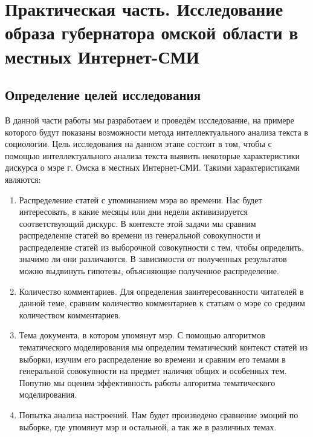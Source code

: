\chapter{Практическая часть. Исследование образа губернатора омской области в местных Интернет-СМИ} \label{chapt2}
\section{Определение целей исследования} \label{sect2_1}
В данной части работы мы разработаем и проведём исследование, на примере которого будут показаны возможности метода интеллектуального анализа текста в социологии. Цель исследования на данном этапе состоит в том, чтобы с помощью интеллектуального анализа текста выявить некоторые характеристики дискурса о мэре г. Омска в местных Интернет-СМИ. Такими характеристиками являются:
\begin{enumerate}
\item Распределение статей с упоминанием мэра во времени. Нас будет интересовать, в какие месяцы или дни недели активизируется соответствующий дискурс. В контексте этой задачи мы сравним распределение статей во времени из генеральной совокупности и распределение статей из выборочной совокупности с тем, чтобы определить, значимо ли они различаются. В зависимости от полученных результатов можно выдвинуть гипотезы, объясняющие полученное распределение.
\item Количество комментариев. Для определения заинтересованности читателей в данной теме, сравним количество комментариев к статьям о мэре со средним количеством комментариев.
\item Тема документа, в котором упомянут мэр. С помощью алгоритмов тематического моделирования мы определим тематический контекст статей из выборки, изучим его распределение во времени и сравним его темами в генеральной совокупности на предмет наличия общих и особенных тем. Попутно мы оценим эффективность работы алгоритма тематического моделирования. %
\item Попытка анализа настроений. Нам будет произведено сравнение эмоций по выборке, где упомянут мэр и остальной, а так же в различных темах.
\end{enumerate}
